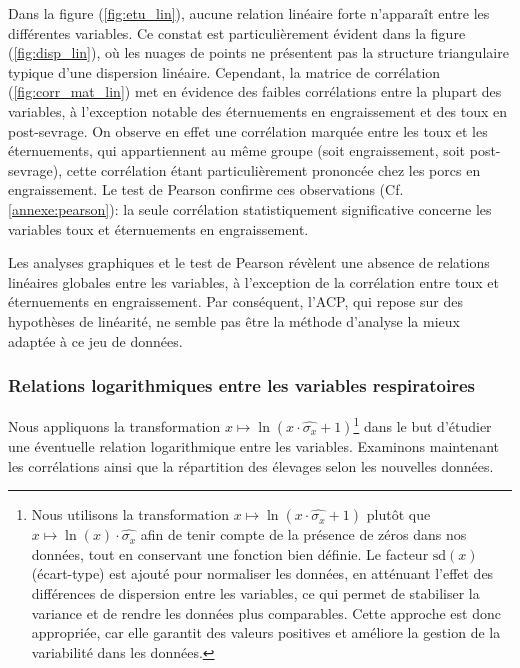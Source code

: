 \documentclass{article}
\begin{document}
Dans la figure (\ref{fig:etu_lin}), aucune relation linéaire forte n’apparaît entre les différentes variables. Ce constat est particulièrement évident dans la figure (\ref{fig:disp_lin}), où les nuages de points ne présentent pas la structure triangulaire typique d’une dispersion linéaire.
Cependant, la matrice de corrélation (\ref{fig:corr_mat_lin}) met en évidence des faibles corrélations entre la plupart des variables, à l’exception notable des éternuements en engraissement et des toux en post-sevrage. On observe en effet une corrélation marquée entre les toux et les éternuements, qui appartiennent au même groupe (soit engraissement, soit post-sevrage), cette corrélation étant particulièrement prononcée chez les porcs en engraissement.
Le test de Pearson confirme ces observations (Cf.\text{ }\ref{annexe:pearson}): la seule corrélation statistiquement significative concerne les variables toux et éternuements en engraissement.

Les analyses graphiques et le test de Pearson révèlent une absence de relations linéaires globales entre les variables, à l'exception de la corrélation entre toux et éternuements en engraissement. Par conséquent, l'ACP, qui repose sur des hypothèses de linéarité, ne semble pas être la méthode d'analyse la mieux adaptée à ce jeu de données.


\subsubsection{Relations logarithmiques entre les variables respiratoires}
Nous appliquons la transformation $x \longmapsto \ln(x \cdot \hat{{\sigma_x}} + 1)$\text{ }\footnote{Nous utilisons la transformation \( x \longmapsto \ln(x \cdot \hat{{\sigma_x}} + 1) \) plutôt que \( x \longmapsto \ln(x) \cdot \hat{{\sigma_x}} \) afin de tenir compte de la présence de zéros dans nos données, tout en conservant une fonction bien définie. Le facteur \( \text{sd}(x) \) (écart-type) est ajouté pour normaliser les données, en atténuant l'effet des différences de dispersion entre les variables, ce qui permet de stabiliser la variance et de rendre les données plus comparables. Cette approche est donc appropriée, car elle garantit des valeurs positives et améliore la gestion de la variabilité dans les données.} dans le but d'étudier une éventuelle relation logarithmique entre les variables.
Examinons maintenant les corrélations ainsi que la répartition des élevages selon les nouvelles données.

\newpage
\end{document}
